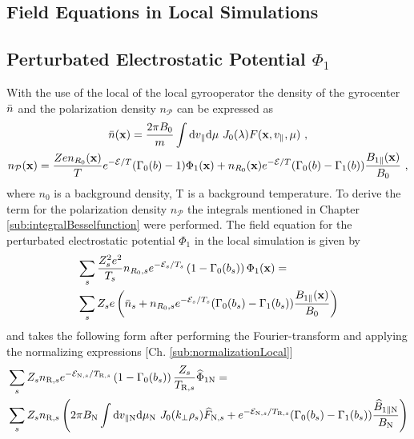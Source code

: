 \subsection{Field Equations in Local Simulations}
\label{sub:fieldLocal}

\subsection*{Perturbated Electrostatic Potential $\Phi_1$}
\label{sub:fieldPotentialLocal}

With the use of the local of the local gyrooperator the density of the gyrocenter $\bar{n}$ and the polarization density $n_\mathcal{P}$ can be expressed as
\begin{gather}
	\bar{n}(\boldsymbol{\mathbf{x}}) = \frac{2\pi B_0}{m} \int \mathrm{d}v_\parallel\mathrm{d}\mu ~ J_0(\lambda) F(\boldsymbol{\mathbf{x}}, v_\parallel, \mu)~, \\
	n_\mathcal{P}(\boldsymbol{\mathbf{x}}) = \frac{Ze n_{R_0}(\boldsymbol{\mathbf{x}})}{T} e^{-\mathcal{E}/T} (\Gamma_0(b) - 1) \Phi_1(\boldsymbol{\mathbf{x}}) + n_{R_0}(\boldsymbol{\mathbf{x}}) e^{-\mathcal{E}/T} (\Gamma_0(b) - \Gamma_1(b))\frac{B_{1\parallel}(\boldsymbol{\mathbf{x}})}{B_0}~,
	\label{eq:particleDensityLocal}
\end{gather}
where $n_0$ is a background density, T is a background temperature. To derive the term for the polarization density $n_\mathcal{P}$ the integrals mentioned in Chapter \ref{sub:integralBesselfunction} were performed. The field equation for the perturbated electrostatic potential $\Phi_1$ in the local simulation is given by
\begin{gather}
    \begin{aligned}
        &\sum_s \frac{Z_s^2e^2}{T_s} n_{R_0,s} e^{-\mathcal{E}_s/T_s} \left(1 - \Gamma_0(b_s)\right) \Phi_1(\boldsymbol{\mathbf{x}}) = \\
        &\sum_s Z_se \left(\bar{n}_s + n_{R_0,s} e^{-\mathcal{E}_s/T_s} (\Gamma_0(b_s) - \Gamma_1(b_s))\frac{B_{1\parallel}(\boldsymbol{\mathbf{x}})}{B_0} \right)
        \label{eq:fieldPotentialLocal}
    \end{aligned}
\end{gather}
and takes the following form after performing the Fourier-transform and applying the normalizing expressions [Ch. \ref{sub:normalizationLocal}]
\begin{gather}
    \begin{aligned}
        &\sum_s Z_s n_{\mathrm{R},s} e^{-\mathcal{E}_{\mathrm{N},s}/T_{\mathrm{R},s}} \left(1 - \Gamma_0(b_s)\right) \frac{Z_s}{T_{\mathrm{R},s}} \widehat{\Phi}_{1 \mathrm{N}} = \\
        &\sum_s Z_sn_{\mathrm{R},s} \left(2\pi B_\mathrm{N} \int \mathrm{d}v_{\parallel \mathrm{N}} \mathrm{d}\mu_\mathrm{N} ~ J_0(k_\perp \rho_s) \widehat{F}_{\mathrm{N},s} + e^{-\mathcal{E}_{\mathrm{N},s}/T_{\mathrm{R},s}} (\Gamma_0(b_s) - \Gamma_1(b_s))\frac{\widehat{B}_{1\parallel \mathrm{N}}}{B_\mathrm{N}} \right)
        \label{eq:fieldPotentialLocalNorm}
    \end{aligned}
\end{gather}

